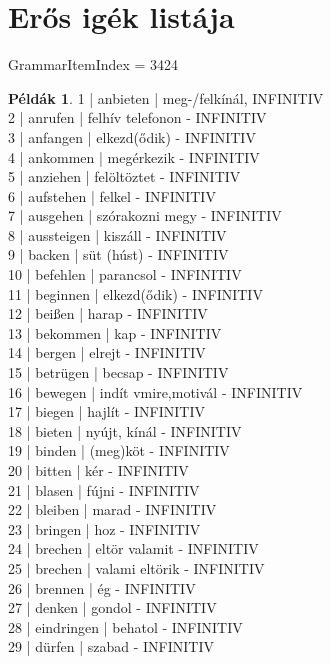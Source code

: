 \documentclass{article}
\theoremstyle{definition}
\newtheorem*{exmp}{Példák}
\begin{document}
\section{Erős igék listája}

GrammarItemIndex = 3424

\begin{exmp}
1 | anbieten | meg-/felkínál, INFINITIV\\
2 | anrufen | felhív telefonon - INFINITIV\\
3 | anfangen | elkezd(ődik) - INFINITIV\\
4 | ankommen | megérkezik - INFINITIV\\
5 | anziehen | felöltöztet - INFINITIV\\
6 | aufstehen | felkel - INFINITIV\\
7 | ausgehen | szórakozni megy - INFINITIV\\
8 | aussteigen | kiszáll - INFINITIV\\
9 | backen | süt (húst) - INFINITIV\\
10 | befehlen | parancsol - INFINITIV\\
11 | beginnen | elkezd(ődik) - INFINITIV\\
12 | beißen | harap - INFINITIV\\
13 | bekommen | kap - INFINITIV\\
14 | bergen | elrejt - INFINITIV\\
15 | betrügen | becsap - INFINITIV\\
16 | bewegen | indít vmire,motivál - INFINITIV\\
17 | biegen | hajlít - INFINITIV\\
18 | bieten | nyújt, kínál - INFINITIV\\
19 | binden | (meg)köt - INFINITIV\\
20 | bitten | kér - INFINITIV\\
21 | blasen | fújni - INFINITIV\\
22 | bleiben | marad - INFINITIV\\
23 | bringen | hoz - INFINITIV\\
24 | brechen | eltör valamit - INFINITIV\\
25 | brechen | valami eltörik - INFINITIV\\
26 | brennen | ég - INFINITIV\\
27 | denken | gondol - INFINITIV\\
28 | eindringen | behatol - INFINITIV\\
29 | dürfen | szabad - INFINITIV\\

\end{exmp}
\end{document}
